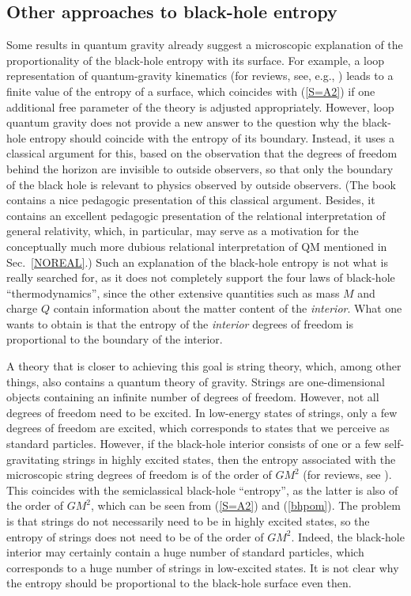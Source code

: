 \documentclass[12pt]{article}
\begin{document}
\subsection{Other approaches to black-hole entropy}

Some results in quantum gravity already suggest a microscopic explanation
of the proportionality of the black-hole entropy with its surface.
For example, a loop representation of quantum-gravity kinematics
(for reviews, see, e.g., \cite{rov,rovbook})
leads to a finite value of the entropy of a surface, which coincides 
with (\ref{S=A2}) if one additional 
free parameter of the theory is adjusted appropriately. However, loop quantum
gravity does not provide a new answer to the question why the black-hole 
entropy should coincide with the entropy of its boundary. Instead, it uses
a classical argument for this, based on the observation that 
the degrees of freedom behind the horizon are invisible to outside 
observers, so that only the boundary of the black hole is relevant 
to physics observed by outside observers. (The book \cite{rovbook}
contains a nice pedagogic presentation of this classical argument.
Besides, it contains an excellent pedagogic presentation 
of the relational interpretation of general relativity, which, in particular,
may serve as a motivation for the conceptually much more dubious 
relational interpretation of QM \cite{rov1,rov2} mentioned in 
Sec.~\ref{NOREAL}.) Such an explanation of the black-hole entropy 
is not what is really searched for, as it does not completely 
support the four laws of black-hole ``thermodynamics'', since 
the other extensive quantities such as mass $M$ and charge $Q$
contain information about the matter content of the {\em interior}.
What one wants to obtain is that the entropy of the {\em interior}
degrees of freedom is proportional to the boundary of the interior.

A theory that is closer to achieving this goal is string theory,
which, among other things, also contains a quantum theory of gravity.
Strings are one-dimensional objects containing an infinite 
number of degrees of freedom. However, not all degrees 
of freedom need to be excited. In low-energy states 
of strings, only a few degrees of freedom are excited, which corresponds 
to states that we perceive as standard particles. 
However, if the black-hole interior consists of one or a few 
self-gravitating 
strings in highly excited states, then the entropy associated 
with the microscopic string degrees of freedom is 
of the order of $GM^2$ (for reviews, see \cite{zwie,horow}).
This coincides with the semiclassical black-hole 
``entropy'', as the latter is also of the order of 
$GM^2$, which can be seen from (\ref{S=A2}) and (\ref{bhpom}). 
The problem is that strings do not necessarily need to be 
in highly excited states, so the entropy of strings 
does not need to be of the order of $GM^2$. Indeed, the black-hole
interior may certainly contain a huge 
number of standard particles, which corresponds to a huge 
number of strings in low-excited states. It is not clear 
why the entropy should be proportional 
to the black-hole surface even then.
\end{document}
